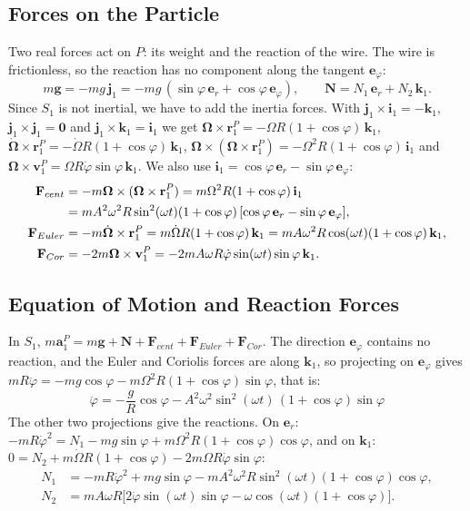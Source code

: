 \documentclass[11pt,a4paper]{article}
\numberwithin{equation}{section}
\newcommand{\er}{\mathbf{e}_r}
\newcommand{\ephi}{\mathbf{e}_\varphi}
\newcommand{\ii}{\mathbf{i}_1}
\newcommand{\jj}{\mathbf{j}_1}
\newcommand{\kk}{\mathbf{k}_1}
\newcommand{\rr}{\mathbf{r}_1^P}
\newcommand{\NN}{\mathbf{N}}
\newcommand{\FF}{\mathbf{F}}
\newcommand{\Om}{\boldsymbol{\Omega}}
\newcommand{\dOm}{\dot{\boldsymbol{\Omega}}}
\newcommand{\dph}{\dot\varphi}
\newcommand{\ddph}{\ddot\varphi}
\begin{document}
\subsection{Forces on the Particle}
Two real forces act on $P$: its weight and the reaction of the wire. The wire is frictionless, so the reaction has no component along the tangent $\ephi$:
\begin{equation}
m\mathbf{g}=-mg\,\jj=-mg\,(\sin\varphi\,\er+\cos\varphi\,\ephi),\qquad \NN=N_1\,\er+N_2\,\kk .\label{eq:real}
\end{equation}
Since $S_1$ is not inertial, we have to add the inertia forces. With $\jj\times\ii=-\kk$, $\jj\times\jj=\mathbf 0$ and $\jj\times\kk=\ii$ we get $\Om\times\rr=-\Omega R(1+\cos\varphi)\,\kk$, $\dOm\times\rr=-\dot\Omega R(1+\cos\varphi)\,\kk$, $\Om\times(\Om\times\rr)=-\Omega^2 R(1+\cos\varphi)\,\ii$ and $\Om\times\mathbf{v}_1^P=\Omega R\dph\sin\varphi\,\kk$. We also use $\ii=\cos\varphi\,\er-\sin\varphi\,\ephi$:
\begin{align}
\FF_{cent}&=-m\Om\times(\Om\times\rr)=m\Omega^2 R(1+\cos\varphi)\,\ii\notag\\
&=mA^2\omega^2R\sin^2(\omega t)(1+\cos\varphi)\,[\cos\varphi\,\er-\sin\varphi\,\ephi],\label{eq:Fcent}\\
\FF_{Euler}&=-m\dOm\times\rr=m\dot\Omega R(1+\cos\varphi)\,\kk=mA\omega^2R\cos(\omega t)(1+\cos\varphi)\,\kk,\label{eq:Feul}\\
\FF_{Cor}&=-2m\Om\times\mathbf{v}_1^P=-2mA\omega R\dph\sin(\omega t)\sin\varphi\,\kk .\label{eq:Fcor}
\end{align}

\subsection{Equation of Motion and Reaction Forces}
In $S_1$, $m\mathbf{a}_1^P=m\mathbf{g}+\NN+\FF_{cent}+\FF_{Euler}+\FF_{Cor}$. The direction $\ephi$ contains no reaction, and the Euler and Coriolis forces are along $\kk$, so projecting on $\ephi$ gives $mR\ddph=-mg\cos\varphi-m\Omega^2 R(1+\cos\varphi)\sin\varphi$, that is:
\begin{equation}
\boxed{\ddph=-\frac{g}{R}\cos\varphi-A^2\omega^2\sin^2(\omega t)\,(1+\cos\varphi)\sin\varphi}\label{eq:eom}
\end{equation}
The other two projections give the reactions. On $\er$: $-mR\dph^2=N_1-mg\sin\varphi+m\Omega^2 R(1+\cos\varphi)\cos\varphi$, and on $\kk$: $0=N_2+m\dot\Omega R(1+\cos\varphi)-2m\Omega R\dph\sin\varphi$:
\begin{align}
N_1&=-mR\dph^2+mg\sin\varphi-mA^2\omega^2R\sin^2(\omega t)(1+\cos\varphi)\cos\varphi,\label{eq:N1}\\
N_2&=mA\omega R\big[2\dph\sin(\omega t)\sin\varphi-\omega\cos(\omega t)(1+\cos\varphi)\big].\label{eq:N2}
\end{align}
\end{document}
